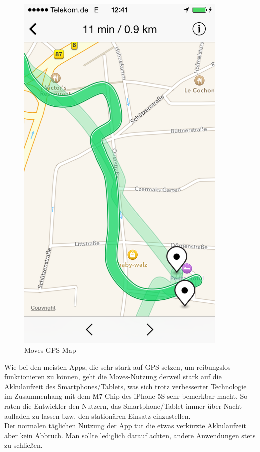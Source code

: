 \begin{figure}
\centering
\includegraphics[width=0.9\textwidth]{images/moves-app-map.PNG}
\caption{Moves GPS-Map \cite{fig:GPS-Map}}
\label{fig:GPS-Map}
\end{figure}

Wie bei den meisten Apps, die sehr stark auf GPS setzen, um reibungslos funktionieren zu können, geht die Moves-Nutzung derweil stark auf die Akkulaufzeit des Smartphones/Tablets, was sich trotz verbesserter Technologie im Zusammenhang mit dem M7-Chip des iPhone 5S sehr bemerkbar macht. 
So raten die Entwickler den Nutzern, das Smartphone/Tablet immer über Nacht aufladen zu lassen bzw. den stationären Einsatz einzustellen.
\\
Der normalen täglichen Nutzung der App tut die etwas verkürzte Akkulaufzeit aber kein Abbruch. 
Man sollte lediglich darauf achten, andere Anwendungen stets zu schließen.

